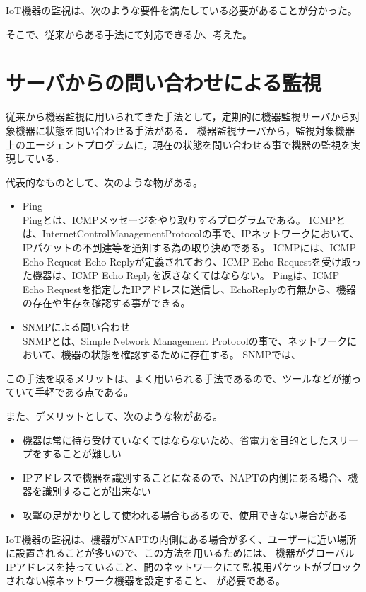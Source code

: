 IoT機器の監視は、次のような要件を満たしている必要があることが分かった。

そこで、従来からある手法にて対応できるか、考えた。
\section{サーバからの問い合わせによる監視}
	従来から機器監視に用いられてきた手法として，定期的に機器監視サーバから対象機器に状態を問い合わせる手法がある．
	機器監視サーバから，監視対象機器上のエージェントプログラムに，現在の状態を問い合わせる事で機器の監視を実現している．
	\medskip

	代表的なものとして、次のような物がある。
	\begin{itemize}
		\item Ping\\
			Pingとは、ICMPメッセージをやり取りするプログラムである。
			ICMPとは、InternetControlManagementProtocolの事で、IPネットワークにおいて、IPパケットの不到達等を通知する為の取り決めである。
			ICMPには、ICMP Echo Request Echo Replyが定義されており、ICMP Echo Requestを受け取った機器は、ICMP Echo Replyを返さなくてはならない。
			Pingは、ICMP Echo Requestを指定したIPアドレスに送信し、EchoReplyの有無から、機器の存在や生存を確認する事ができる。

		\item SNMPによる問い合わせ\\
			SNMPとは、Simple Network Management Protocolの事で、ネットワークにおいて、機器の状態を確認するために存在する。
			SNMPでは、

	\end{itemize}
	
	この手法を取るメリットは、よく用いられる手法であるので、ツールなどが揃っていて手軽である点である。
	
	また、デメリットとして、次のような物がある。
	\begin{itemize}
		\item 機器は常に待ち受けていなくてはならないため、省電力を目的としたスリープをすることが難しい
		\item IPアドレスで機器を識別することになるので、NAPTの内側にある場合、機器を識別することが出来ない
		\item 攻撃の足がかりとして使われる場合もあるので、使用できない場合がある
	\end{itemize}

	IoT機器の監視は、機器がNAPTの内側にある場合が多く、ユーザーに近い場所に設置されることが多いので、この方法を用いるためには、
	機器がグローバルIPアドレスを持っていること、間のネットワークにて監視用パケットがブロックされない様ネットワーク機器を設定すること、
	が必要である。

